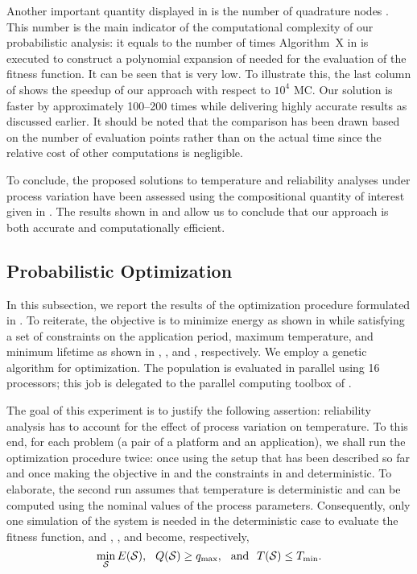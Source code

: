 Another important quantity displayed in  is the number of quadrature
nodes \nq. This number is the main indicator of the computational complexity of
our probabilistic analysis: it equals to the number of times Algorithm~X in
 is executed to construct a polynomial expansion of
 needed for the evaluation of the fitness function.
It can be seen that \nq is very low. To illustrate this, the last column of
 shows the speedup of our approach with respect to $10^4$ \ac{MC}.
Our solution is faster by approximately 100--200 times while delivering highly
accurate results as discussed earlier. It should be noted that the comparison
has been drawn based on the number of evaluation points rather than on the
actual time since the relative cost of other computations is negligible.

To conclude, the proposed solutions to temperature and reliability analyses
under process variation have been assessed using the compositional quantity of
interest given in . The results shown in
 and  allow us to conclude that our approach is both
accurate and computationally efficient.

\subsection{Probabilistic Optimization}

In this subsection, we report the results of the optimization procedure
formulated in . To reiterate, the objective is to
minimize energy as shown in  while satisfying a set of
constraints on the application period, maximum temperature, and minimum lifetime
as shown in , , and
, respectively. We employ a genetic algorithm for
optimization. The population is evaluated in parallel using 16 processors; this
job is delegated to the parallel computing toolbox of  \cite{matlab}.

The goal of this experiment is to justify the following assertion: reliability
analysis has to account for the effect of process variation on temperature. To
this end, for each problem (a pair of a platform and an application), we shall
run the optimization procedure twice: once using the setup that has been
described so far and once making the objective in  and the
constraints in  and 
deterministic. To elaborate, the second run assumes that temperature is
deterministic and can be computed using the nominal values of the process
parameters. Consequently, only one simulation of the system is needed in the
deterministic case to evaluate the fitness function, and ,
, and  become,
respectively,
\[
  \min_{\mathcal{S}} E(\mathcal{S}), \hspace{0.7em}
  Q(\mathcal{S}) \geq q_{\mathrm{max}}, \hspace{0.7em} \text{and} \hspace{0.7em}
  T(\mathcal{S}) \leq T_{\mathrm{min}}.
\]

